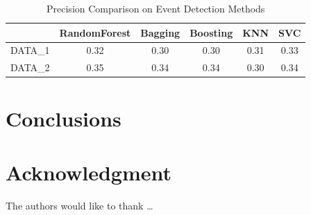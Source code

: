 \begin{table} [htbp] \centering
  \caption{Precision Comparison on Event Detection Methods}
  \label{tbl:overall-experiments}
  \begin{tabular}{cccccc}
\toprule
 & RandomForest  & Bagging & Boosting & KNN & SVC\\
\midrule
DATA\_1&  0.32 &  0.30 &  0.30 & 0.31 & 0.33\\
DATA\_2 &  0.35 &  0.34 &  0.34 & 0.30 & 0.34\\
\bottomrule
\end{tabular}
\end{table}



\section{Conclusions} \label{sec-conclusions}



\section*{Acknowledgment}

\lipsum[1]


The authors would like to thank \ldots

